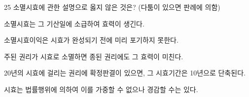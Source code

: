 \begin{question}{25}
소멸시효에 관한 설명으로 옳지 않은 것은? (다툼이 있으면 판례에 의함)
\begin{choices}
  \item 소멸시효는 그 기산일에 소급하여 효력이 생긴다.
  \item 소멸시효이익은 시효가 완성되기 전에 미리 포기하지 못한다.
  \item 주된 권리가 시효로 소멸하면 종된 권리에도 그 효력이 미친다.
  \item 20년의 시효에 걸리는 권리에 확정판결이 있으면, 그 시효기간은 10년으로 단축된다.
  \item 시효는 법률행위에 의하여 이를 가중할 수 없으나 경감할 수는 있다.
\end{choices}
\end{question}
